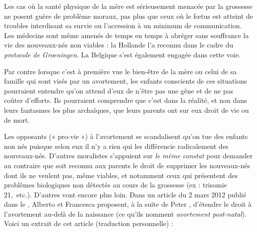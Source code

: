  Les cas où la santé physique de la mère est sérieusement menacée par la grossesse ne posent guère de problème moraux, pas plus que ceux où le fœtus est atteint de troubles interdisant sa survie ou l'accession à un minimum de communication. Les médecins sont même amenés de temps en temps à abréger sans souffrance la vie des nouveaux-nés non viables : la Hollande l'a reconnu dans le cadre du \emph{protocole de Groeningen}. La Belgique s'est également engagée dans cette voie. 
 
 Par contre lorsque c'est à première vue le bien-être de la mère ou celui de sa famille qui sont visés par un avortement, les enfants conscients de ces situations pourraient entendre qu'on attend d'eux de n'être pas une gêne et de ne pas coûter d'efforts. Ils pourraient comprendre que c'est dans la réalité, et non dans leurs fantasmes les plus archaïques, que leurs parents ont sur eux droit de vie ou de mort.

 Les opposants (« pro-vie ») à l'avortement se scandalisent qu'on tue des enfants non nés puisque selon eux il n'y a rien qui les différencie radicalement des nouveaux-nés. D'autres moralistes s'appuient sur  \emph{le même constat} pour demander au contraire que soit reconnu aux parents le droit de supprimer les nouveaux-nés dont ils ne veulent pas, même viables, et notamment ceux qui présentent des problèmes biologiques non détectés au cours de la grossesse (ex : trisomie 21,~etc.). D'autres vont encore plus loin. Dans un article du 2 mars 2012 publié dans le , Alberto  et Francesca  proposent, à la suite de Peter , d'étendre le droit à l'avortement au-delà de la naissance (ce qu'ils nomment \emph{avortement post-natal}). Voici un extrait de cet article (traduction personnelle) :

